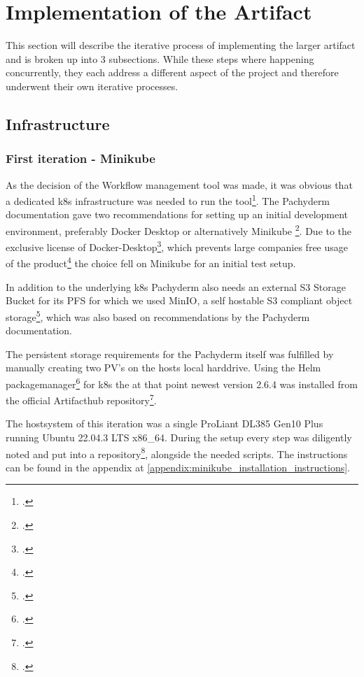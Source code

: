 
\section{Implementation of the Artifact}

This section will describe the iterative process of implementing the larger artifact and is broken up into 3 subsections.
While these steps where happening concurrently, they each address a different aspect of the project and therefore underwent their own iterative processes.



\subsection{Infrastructure}


\subsubsection{First iteration - Minikube}
As the decision of the Workflow management tool was made, it was obvious that a dedicated \ac{k8s} infrastructure was needed to run the tool\footcite{PachydermDocsOnPrem}.
The Pachyderm documentation gave two recommendations for setting up an initial development environment, preferably Docker Desktop or alternatively Minikube \footcite{PachydermDocsLocal}.
Due to the exclusive license of Docker-Desktop\footcite{DockerTermsService2022},
which prevents large companies free usage of the product\footcite{DockerFAQsDocker2021} the choice fell on Minikube for an initial test setup.

In addition to the underlying \ac{k8s} Pachyderm also needs an external S3 Storage Bucket for its \ac{PFS} for which we used MinIO,
a self hostable S3 compliant object storage\footcite{incMinIOMinIOKubernetes}, which was also based on recommendations by the Pachyderm documentation.

The persistent storage requirements for the Pachyderm itself was fulfilled by manually creating two \ac{PV}'s on the hosts local harddrive.
Using the Helm packagemanager\footcite{HelmDocsHome} for \ac{k8s} the at that point newest version 2.6.4 was installed from the official Artifacthub repository\footcite{ArtifacthubPachyderm}.

The hostsystem of this iteration was a single ProLiant DL385 Gen10 Plus running Ubuntu 22.04.3 LTS x86\_64.
During the setup every step was diligently noted and put into a repository\footcite{eckerthInstallationInstructionsMinikube}, alongside the needed scripts. 
The instructions can be found in the appendix at \ref{appendix:minikube_installation_instructions}.



